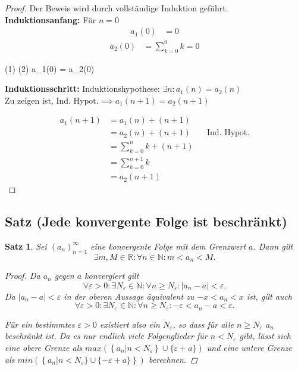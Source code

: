 \documentclass{article}
\newtheorem{thm}{Satz}[section]
\newenvironment{aleq}{
\begin{equation}
\begin{aligned}
}{
\end{aligned}
\end{equation}
}
\newenvironment{aleq*}{\begin{equation*}\begin{aligned}}{\end{aligned}\end{equation*}}
\begin{document}
	\begin{proof} Der Beweis wird durch vollständige Induktion geführt. \\
	\textbf{Induktionsanfang:} Für \(n=0\)
	\begin{aleq}
			a_1(0) &= 0 
	\end{aleq}
	\begin{aleq}
			a_2(0) &= \sum_{k=0}^{0} k = 0
	\end{aleq}
	\begin{aleq*}
		(1) \land (2) \implies a_1(0) = a_2(0)
	\end{aleq*}
	
	
	\textbf{Induktionsschritt:} Induktionshypothese: \(\exists n \colon a_1(n) = a_2(n)\) \\
	Zu zeigen ist, \(\text{Ind. Hypot.} \implies a_1(n+1) = a_2(n+1)\)
	
	\begin{equation*}
		\begin{aligned}
			a_1(n+1) &= a_1(n) + (n+1) \\
			&= a_2(n) + (n+1) && \text{Ind. Hypot.} \\
			&= \sum_{k=0}^{n}k + (n+1) \\
			&= \sum_{k=0}^{n+1}k \\
			&= a_2(n+1)
		\end{aligned}
	\end{equation*}
	\end{proof}
	
	\subsection{Satz (Jede konvergente Folge ist beschränkt)}
	\begin{thm}
		Sei \((a_n)_{n=1}^{\infty}\) eine konvergente Folge mit dem Grenzwert \(a\). Dann gilt
		\[
		\exists m,M \in \mathbb{R} \colon \forall n \in \mathbb{N} \colon m < a_n < M \text{.}
		\]
		
		\begin{proof}
			Da \(a_n\) gegen \(a\) konvergiert gilt
		\[
		\forall \varepsilon>0 \colon \exists N_{\varepsilon} \in \mathbb{N} \colon \forall n \geq N_{\varepsilon} \colon |a_n - a| < \varepsilon \text{.}
		\]
		Da \(|a_n - a| < \varepsilon\) in der oberen Aussage äquivalent zu \(-x < a_n < x\) ist, gilt auch
		\[
		\forall \varepsilon>0 \colon \exists N_{\varepsilon} \in \mathbb{N} \colon \forall n \geq N_{\varepsilon} \colon -\varepsilon < a_n - a < \varepsilon \text{.}
		\]
		\par
		Für ein bestimmtes \(\varepsilon > 0\) existiert also ein \(N_{\varepsilon}\), so dass 
		für alle \(n \geq N_{\varepsilon}\) \(a_n\) beschränkt ist. Da es nur endlich viele Folgenglieder für \(n < N_{\varepsilon}\) gibt, lässt sich eine obere Grenze als \(max (\left\lbrace a_n | n < N_{\varepsilon} \right\rbrace  \cup \lbrace \varepsilon + a \rbrace)\) und eine untere Grenze als \(min (\left\lbrace a_n | n < N_{\varepsilon} \rbrace \cup \lbrace -\varepsilon + a \rbrace\right\rbrace)\) berechnen.
		\end{proof}
	\end{thm}
	
\end{document}
